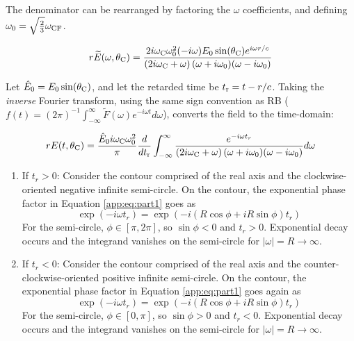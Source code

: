 \documentclass[amsmath,amssymb,aps,prd,10pt,twocolumn]{revtex4}
\begin{document}
The denominator can be rearranged by factoring the $\omega$ coefficients, and defining $\omega_0 = \sqrt{\frac{2}{3	}}\omega_{\rm CF}$.

\begin{equation}
r\widetilde{E}(\omega,\theta_{\rm C}) = \frac{ 2 i \omega_{\rm C} \omega_{\rm 0}^2 (-i\omega) E_0 \sin(\theta_{\rm C}) e^{i\omega r/c}}{ \left(2 i \omega_{\rm C} + \omega \right) (\omega+i\omega_{\rm 0}) (\omega - i\omega_{\rm 0}) }
\end{equation}

Let $\hat{E}_{\rm 0} = E_{\rm 0} \sin(\theta_{\rm C})$, and let the retarded time be $t_{\rm r} = t - r/c$.  Taking the \textit{inverse} Fourier transform, using the same sign convention as RB \cite{10.1103/physrevd.65.016003} ($f(t) = (2\pi)^{-1} \int_{-\infty}^{\infty} \widetilde{F}(\omega) e^{-i\omega t} d\omega$), converts the field to the time-domain:

\begin{widetext}
\begin{equation}
r E(t,\theta_{\rm C}) = \frac{\hat{E}_0 i \omega_{\rm C} \omega_{\rm 0}^2}{\pi} \frac{d}{dt_{\rm r}}\int_{-\infty}^{\infty} \frac{ e^{-i\omega t_r}}{ \left(2 i \omega_{\rm C} + \omega \right) (\omega+i\omega_{\rm 0}) (\omega - i\omega_{\rm 0}) } d\omega \label{app:eq:part1}
\end{equation}
\end{widetext}

\begin{enumerate}
\item If $t_r > 0$: Consider the contour comprised of the real axis and the clockwise-oriented negative infinite semi-circle.  On the contour, the exponential phase factor in Equation \ref{app:eq:part1} goes as
\begin{equation}
\exp(-i\omega t_r) = \exp(-i(R\cos\phi +iR\sin\phi) t_r)
\end{equation}
For the semi-circle, $\phi \in [\pi,2\pi]$, so $\sin\phi < 0$ and $t_r > 0$.  Exponential decay occurs and the integrand vanishes on the semi-circle for $|\omega| = R \to \infty$.
\item If $t_r < 0$: Consider the contour comprised of the real axis and the counter-clockwise-oriented positive infinite semi-circle.  On the contour, the exponential phase factor in Equation \ref{app:eq:part1} goes again as
\begin{equation}
\exp(-i\omega t_r) = \exp(-i(R\cos\phi +iR\sin\phi) t_r)
\end{equation}
For the semi-circle, $\phi \in [0,\pi]$, so $\sin\phi > 0$ and $t_r < 0$.  Exponential decay occurs and the integrand vanishes on the semi-circle for $|\omega| = R \to \infty$.
\end{enumerate}
\end{document}
